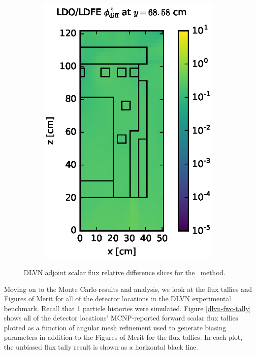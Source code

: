 \begin{figure}[!htb]
\begin{subfigure}{0.4\textwidth}
\includegraphics[max height=0.445\textheight]
{img/dlvn-plots/fwc-adj/flux-diff-rel-ldfe01.eps}
\label{dlvn-fwc-ldfe-ldo}
\end{subfigure}
\caption{DLVN adjoint scalar flux relative difference slices for the \fwc\ method.}
\label{dlvn-fwc-adj-diff-rel}
\end{figure}

\clearpage
Moving on to the Monte Carlo results and analysis, we look at the flux tallies and 
Figures of Merit for all of the detector locations in the DLVN experimental benchmark.
Recall that 1 particle histories were simulated.
Figure \ref{dlvn-fwc-tally} shows all of the detector locations' MCNP-reported forward scalar
flux tallies plotted as a function of angular mesh refinement used to generate biasing 
parameters in addition to the Figures of Merit for the flux tallies.
In each plot, the unbiased flux tally result is shown as a horizontal black line.

